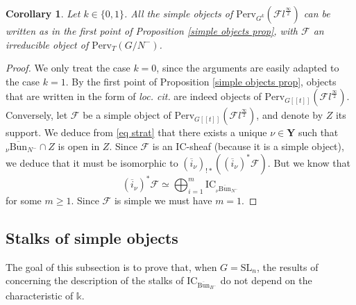 \documentclass[11pt]{amsart}
\theoremstyle{plain}
\newtheorem{coro}[thm]{Corollary}
\theoremstyle{remark}
\numberwithin{equation}{section}
\begin{document}
	\begin{coro}{{\cite[Proposition 4.2.4]{ABBGM}}}\label{coro prop simple}
		Let $k\in\{0,1\}$.  All the simple objects of $\mathrm{Perv}_{G^k}(\mathcal{F}l^{\frac{\infty}{2}})$ can be written as in the first point of Proposition \ref{simple objects prop}, with $\mathcal{F}$ an irreducible object of $\mathrm{Perv}_T(G/N^{-})$.
	\end{coro}
 \begin{proof}
     We only treat the case $k=0$, since the arguments are easily adapted to the case $k=1$. By the first point of Proposition \ref{simple objects prop}, objects that are written in the form of \textit{loc. cit.} are indeed objects of $\mathrm{Perv}_{G[[t]]}(\mathcal{F}l^{\frac{\infty}{2}})$. Conversely, let $\mathcal{F}$ be a simple object of $\mathrm{Perv}_{G[[t]]}(\mathcal{F}l^{\frac{\infty}{2}})$, and denote by $Z$ its support. We deduce from \eqref{eq strat} that there exists a unique $\nu\in\mathbf{Y}$ such that ${_{\nu}\overline{\mathrm{Bun}}_{N^-}}\cap Z$ is open in $Z$. Since $\mathcal{F}$ is an IC-sheaf (because it is a simple object), we deduce that it must be isomorphic to $(\overline{i}_\nu)_{!*}((\overline{i}_\nu)^*\mathcal{F})$. But we know that
     $$(\overline{i}_\nu)^*\mathcal{F}\simeq\bigoplus_{i=1}^m\mathrm{IC}_{_{\nu}\overline{\mathrm{Bun}}_{N^-}}$$
     for some $m\geq 1$. Since $\mathcal{F}$ is simple we must have $m=1$.
 \end{proof}
	
	\subsection{Stalks of simple objects}\label{section Intersection cohomology}
	The goal of this subsection is to prove that, when $G=\mathrm{SL}_n$, the results of \cite{BBGM} concerning the description of the stalks of $\mathrm{IC}_{\overline{\mathrm{Bun}}_{B^-}}$ do not depend on the characteristic of $\mathbb{k}$.
	
\end{document}
